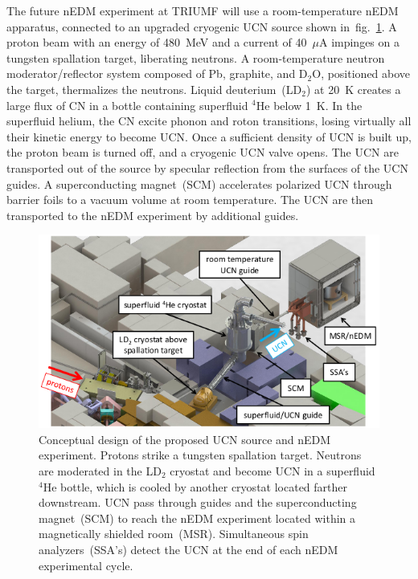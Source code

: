 The future nEDM experiment at TRIUMF will use a room-temperature nEDM
apparatus, connected to an upgraded cryogenic UCN source shown
in~fig.~\ref{fig:triumfEDM}. A proton beam with an energy of 480~MeV
and a current of 40~$\mu$A impinges on a tungsten spallation target,
liberating neutrons. A room-temperature neutron moderator/reflector
system composed of Pb, graphite, and D$_2$O, positioned above the
target, thermalizes the neutrons. Liquid deuterium~(LD$_2$) at 20~K
creates a large flux of CN in a bottle containing superfluid $^4$He
below 1~K. In the superfluid helium, the CN excite phonon and roton
transitions, losing virtually all their kinetic energy to become
UCN. Once a sufficient density of UCN is built up, the proton beam is
turned off, and a cryogenic UCN valve opens. The UCN are transported
out of the source by specular reflection from the surfaces of the UCN
guides. A superconducting magnet~(SCM) accelerates polarized UCN
through barrier foils to a vacuum volume at room temperature. The UCN
are then transported to the nEDM experiment by additional guides.



\begin{figure}[h!]
  \centering
  \includegraphics[width=1.0\textwidth]{edmtriumf.png}
  \caption[Conceptual design of TUCAN's future nEDM
  facility]{Conceptual design of the proposed UCN source and nEDM
    experiment. Protons strike a tungsten spallation target. Neutrons
    are moderated in the LD$_2$ cryostat and become UCN in a
    superfluid $^4$He bottle, which is cooled by another cryostat
    located farther downstream. UCN pass through guides and the
    superconducting magnet~(SCM) to reach the nEDM experiment located
    within a magnetically shielded room~(MSR). Simultaneous spin
    analyzers~(SSA’s) detect the UCN at the end of each nEDM
    experimental cycle.  }
  \label{fig:triumfEDM}
\end{figure}

